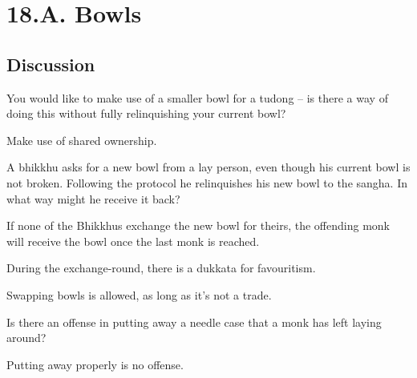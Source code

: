 \chapter{18.A. Bowls}
\renewcommand*{\theChapterTitle}{18.A. Bowls}

\section*{Discussion}


You would like to make use of a smaller bowl for a tudong – is there a way of
doing this without fully relinquishing your current bowl?

\begin{solution}
  Make use of shared ownership.
\end{solution}

  \bigskip


A bhikkhu asks for a new bowl from a lay person, even though his current bowl is not broken.
Following the protocol he relinquishes his new bowl to the sangha. In what way
might he receive it back?

\begin{solution}
  If none of the Bhikkhus exchange the new bowl for theirs, the offending
  monk will receive the bowl once the last monk is reached.

  During the exchange-round, there is a dukkata for favouritism.

  Swapping bowls is allowed, as long as it's not a trade.
\end{solution}

\bigskip


Is there an offense in putting away a needle case that a monk has left laying around? 

\begin{solution}
  Putting away properly is no offense.
\end{solution}


